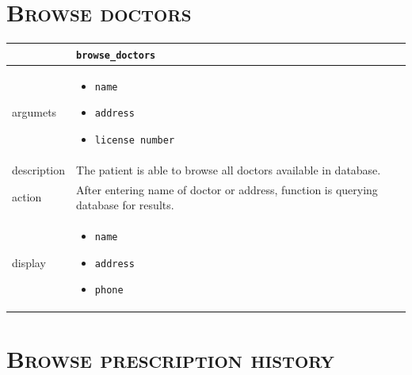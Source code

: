 \section{\textsc{Browse doctors}}

\begin{tabularx}{\textwidth}{ |p{2.5cm}|X| }
	\hline
	 &  \texttt{browse\_doctors}\\
\hline	
argumets & 
\begin{itemize}
\item \texttt{name}
\item \texttt{address}
\item \texttt{license number}
\end{itemize} \\
\hline
description & The patient is able to browse all doctors available in database.\\
\hline
action & After entering name of doctor or address, function is querying database for results.\\
\hline
display &
\begin{itemize}
\item \texttt{name}
\item \texttt{address}
\item \texttt{phone}
\end{itemize}\\
\hline
\end{tabularx}

\section{\textsc{Browse prescription history}}

